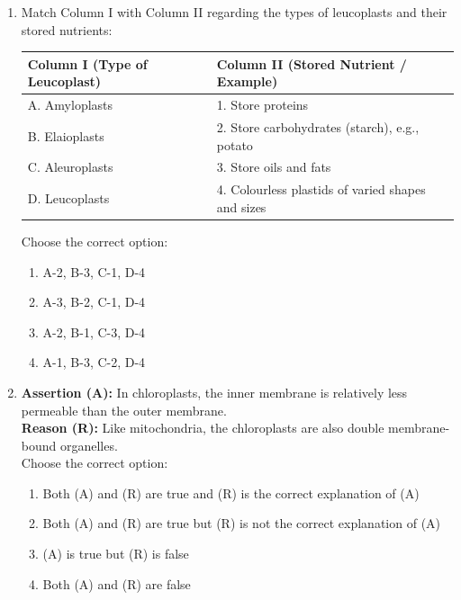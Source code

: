 \documentclass[11pt, a4paper]{article}
\begin{document}
\begin{enumerate}[label=\textbf{\arabic*.}, leftmargin=*, itemsep=8pt]
    \item Match Column I with Column II regarding the types of leucoplasts and their stored nutrients:
    \begin{center}
    \begin{tabular}{@{}ll@{}}
        \toprule
        \textbf{Column I (Type of Leucoplast)} & \textbf{Column II (Stored Nutrient / Example)} \\
        \midrule
        A. Amyloplasts & 1. Store proteins \\
        B. Elaioplasts & 2. Store carbohydrates (starch), e.g., potato \\
        C. Aleuroplasts & 3. Store oils and fats \\
        D. Leucoplasts & 4. Colourless plastids of varied shapes and sizes \\
        \bottomrule
    \end{tabular}
    \end{center}
    Choose the correct option:
    \begin{enumerate}[label=(\alph*)]
        \item A-2, B-3, C-1, D-4
        \item A-3, B-2, C-1, D-4
        \item A-2, B-1, C-3, D-4
        \item A-1, B-3, C-2, D-4
    \end{enumerate}

    \item \textbf{Assertion (A):} In chloroplasts, the inner membrane is relatively less permeable than the outer membrane.\\
    \textbf{Reason (R):} Like mitochondria, the chloroplasts are also double membrane-bound organelles.\\
    Choose the correct option:
    \begin{enumerate}[label=(\alph*)]
        \item Both (A) and (R) are true and (R) is the correct explanation of (A)
        \item Both (A) and (R) are true but (R) is not the correct explanation of (A)
        \item (A) is true but (R) is false
        \item Both (A) and (R) are false
    \end{enumerate}


\end{enumerate}
\end{document}
